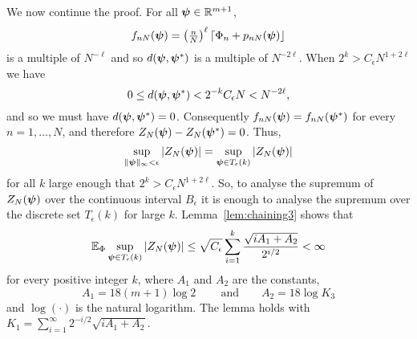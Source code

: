 \documentclass[journal]{IEEEtran}
\begin{document}
\begin{IEEEproof}
We now continue the proof.  For all $\boldsymbol{\psi} \in {\mathbb R}^{m+1}$, 
\[
f_{nN}(\boldsymbol{\psi}) = \left( \tfrac{n}{N}\right)^\ell {\left\lceil \Phi_n + p_{nN}(\boldsymbol{\psi}) \right\rfloor}
\]
is a multiple of $N^{-\ell}$ and so $d(\boldsymbol{\psi}, \boldsymbol{\psi}^*)$ is a multiple of $N^{-2\ell}$.  When $2^k > C_\epsilon N^{1+2\ell}$ we have 
\[
0 \leq d(\boldsymbol{\psi}, \boldsymbol{\psi}^*) < 2^{-k} C_\epsilon N < N^{-2\ell},
\]
and so we must have $d(\boldsymbol{\psi}, \boldsymbol{\psi}^*) = 0$.  Consequently $f_{nN}(\boldsymbol{\psi}) = f_{nN}(\boldsymbol{\psi}^*)$  for every $n = 1, \dots, N$, and therefore $Z_N(\boldsymbol{\psi}) - Z_N(\boldsymbol{\psi}^*) = 0$.  Thus,
\[
\sup_{\|\boldsymbol{\psi}\|_{\infty} < \epsilon } \left\vert  Z_N(\boldsymbol{\psi})  \right\vert = \sup_{\boldsymbol{\psi} \in T_\epsilon(k) } \left\vert  Z_N(\boldsymbol{\psi})  \right\vert
\]
for all $k$ large enough that $2^{k} > C_\epsilon N^{1+2\ell}$.  So, to analyse the supremum of $Z_N(\boldsymbol{\psi})$ over the continuous interval $B_\epsilon$ it is enough to analyse the supremum over the discrete set $T_\epsilon(k)$ for large $k$.  Lemma~\ref{lem:chaining3} shows that 
\[
{\mathbb E}_{\Phi} \sup_{\boldsymbol{\psi} \in T_\epsilon(k) } \left\vert  Z_N(\boldsymbol{\psi})  \right\vert \leq \sqrt{C_\epsilon} \sum_{i=1}^{k}\frac{\sqrt{ i A_1 + A_2}}{2^{i/2}} < \infty
\]
for every positive integer $k$, where $A_1$ and $A_2$ are the constants,
\begin{equation}\label{eq:A1andA2}
A_1 = 18(m+1)\log 2\ \qquad \text{and} \qquad A_2 = 18\log K_3
\end{equation}
and $\log(\cdot)$ is the natural logarithm.  The lemma holds with $K_1 =  \sum_{i=1}^{\infty}2^{-i/2}\sqrt{ i A_1 + A_2 }$.
\end{IEEEproof}
\end{document}
